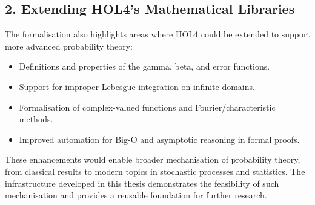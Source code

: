 \subsection*{2. Extending HOL4's Mathematical Libraries}

The formalisation also highlights areas where HOL4 could be extended to support more advanced probability theory:

\begin{itemize}
  \item Definitions and properties of the gamma, beta, and error functions.
  \item Support for improper Lebesgue integration on infinite domains.
  \item Formalisation of complex-valued functions and Fourier/characteristic methods.
  \item Improved automation for Big-O and asymptotic reasoning in formal proofs.
\end{itemize}

These enhancements would enable broader mechanisation of probability theory, from classical results to modern topics in stochastic processes and statistics. The infrastructure developed in this thesis demonstrates the feasibility of such mechanisation and provides a reusable foundation for further research.
